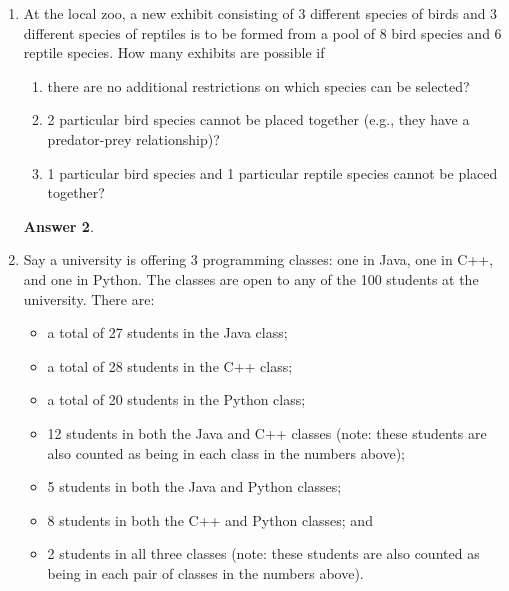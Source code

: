 \documentclass[12pt]{article}
\renewcommand{\(}{\left(}
\renewcommand{\)}{\right)}
\theoremstyle{definition}
\newtheorem*{answer}{Answer}
\begin{document}
\begin{enumerate}
\begin{shaded}
\begin{answer}
        d)
        This case this no different than our 2nd case, similarly we presume a married couple to represent one entity. Then we'll have \[= 5 * 4 * 3 * 2 * 1 ways\] of
        arranging them. Now we know that the couples themselves can be arranged in \[= 2 * 1 ways\] and since there are 5 couples, we'll have
        \[= 120 * 2 * 2 * 2 * 2 * 2 = 3840  ways\] of possible arrangements.
    \end{answer}
    \end{shaded}
    \newpage


\item At the local zoo, a new exhibit consisting of 3 different species of birds and 3 different species of reptiles is to be formed from a pool of 8 bird species and 6 reptile species. How many exhibits are possible if

\begin{enumerate}[label=\alph*.]
\item there are no additional restrictions on which species can be selected?
\item 2 particular bird species cannot be placed together (e.g., they have a predator-prey relationship)?
\item 1 particular bird species and 1 particular reptile species cannot be placed together?

\end{enumerate}

    \begin{shaded}
    \begin{answer}
        
    \end{answer}
    \end{shaded}
    \newpage


\item Say a university is offering 3 programming classes: one in Java, one in C++, and one in Python.  The classes are open to any of the 100 students at the university.  There are:
    \begin{itemize}[leftmargin=.5in]
    \item a total of 27 students in the Java class;
    \item a total of 28 students in the C++ class;
    \item a total of 20 students in the Python class;
    \item 12 students in both the Java and C++ classes (note: these students are also counted as being in each class in the numbers above);
    \item 5 students in both the Java and Python classes;
    \item 8 students in both the C++ and Python classes; and
    \item 2 students in all three classes (note: these students are also counted as being in each pair of classes in the numbers above).
    \end{itemize}


\end{enumerate}
\end{document}
